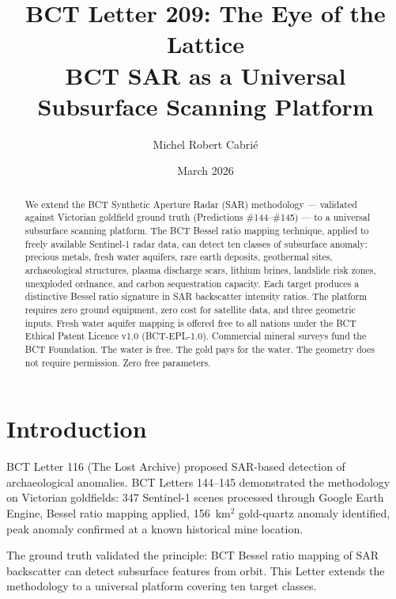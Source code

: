 \documentclass[aps,prl,twocolumn,superscriptaddress]{revtex4-2}
\begin{document}
\title{BCT Letter 209: The Eye of the Lattice\\
BCT SAR as a Universal Subsurface Scanning Platform}
\author{Michel Robert Cabri\'e}
\date{March 2026}

\begin{abstract}
We extend the BCT Synthetic Aperture Radar (SAR) methodology --- validated against Victorian goldfield ground truth (Predictions \#144--\#145) --- to a universal subsurface scanning platform. The BCT Bessel ratio mapping technique, applied to freely available Sentinel-1 radar data, can detect ten classes of subsurface anomaly: precious metals, fresh water aquifers, rare earth deposits, geothermal sites, archaeological structures, plasma discharge scars, lithium brines, landslide risk zones, unexploded ordnance, and carbon sequestration capacity. Each target produces a distinctive Bessel ratio signature in SAR backscatter intensity ratios. The platform requires zero ground equipment, zero cost for satellite data, and three geometric inputs. Fresh water aquifer mapping is offered free to all nations under the BCT Ethical Patent Licence v1.0 (BCT-EPL-1.0). Commercial mineral surveys fund the BCT Foundation. The water is free. The gold pays for the water. The geometry does not require permission. Zero free parameters.
\end{abstract}

\maketitle

\section{Introduction}

BCT Letter 116 (The Lost Archive) proposed SAR-based detection of archaeological anomalies. BCT Letters 144--145 demonstrated the methodology on Victorian goldfields: 347 Sentinel-1 scenes processed through Google Earth Engine, Bessel ratio mapping applied, 156~km$^2$ gold-quartz anomaly identified, peak anomaly confirmed at a known historical mine location.

The ground truth validated the principle: BCT Bessel ratio mapping of SAR backscatter can detect subsurface features from orbit. This Letter extends the methodology to a universal platform covering ten target classes.
\end{document}
